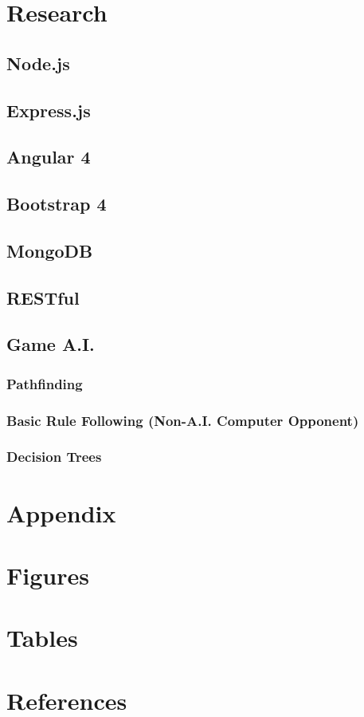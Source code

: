 \documentclass[12pt,a4paper]{report}
\begin{document}
	\section{Research}
			\subsection{Node.js}
			\subsection{Express.js}
			\subsection{Angular 4}
			\subsection{Bootstrap 4}
			\subsection{MongoDB}
			\subsection{RESTful}
			\subsection{Game A.I.}
				\subsubsection{Pathfinding}
				\subsubsection{Basic Rule Following (Non-A.I. Computer Opponent)}
				\subsubsection{Decision Trees}
		
	\section{Appendix}
		
	\section{Figures}
		
	\section{Tables}
		
	\section{References}
		
\end{document}
